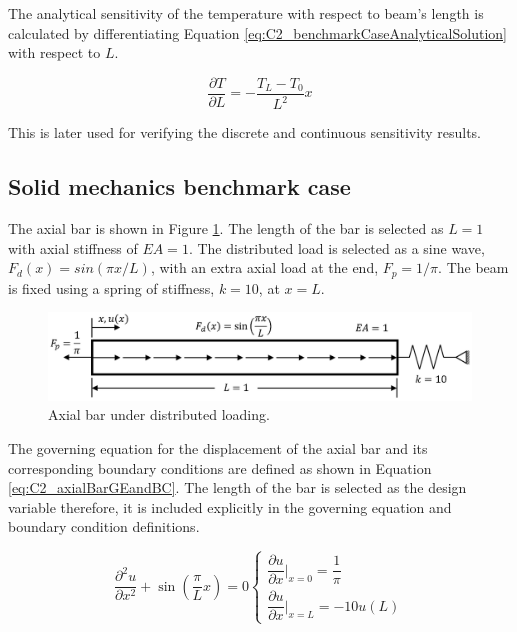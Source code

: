 The analytical sensitivity of the temperature with respect to beam's length is calculated by differentiating Equation \eqref{eq:C2_benchmarkCaseAnalyticalSolution} with respect to $L$.

\begin{equation}
	\frac{\partial T}{\partial L} = -\frac{T_L - T_0}{L^2} x
\end{equation}

This is later used for verifying the discrete and continuous sensitivity results.

\subsection{Solid mechanics benchmark case}\label{section:C2_solid_mechanics_benchmark}
The axial bar is shown in Figure \ref{fig:C2_axialBarPhysicalShape}. The length of the bar is selected as $L = 1$ with axial stiffness of $EA = 1$. The distributed load is selected as a sine wave, $F_d(x) = sin(\pi x/L)$, with an extra axial load at the end, $F_p = 1 / \pi$. The beam is fixed using a spring of stiffness, $k = 10$, at $x = L$.

\begin{figure}[h]
	\centering
	\includegraphics[width=14.00cm]{Chapter_2/figure/solid_mechanics_benchmark.png}
	\caption{Axial bar under distributed loading.}
	\label{fig:C2_axialBarPhysicalShape}
\end{figure}

The governing equation for the displacement of the axial bar and its corresponding boundary conditions are defined as shown in Equation \eqref{eq:C2_axialBarGEandBC}. The length of the bar is selected as the design variable therefore, it is included explicitly in the governing equation and boundary condition definitions.

\begin{subequations}
\begin{equation}\label{eq:C2_axialBarGE}
	\frac{\partial^2 u}{\partial x^2} + \sin \left( \frac{\pi}{L} x \right) = 0
\end{equation}
\begin{equation}\label{eq:C2_axialBarBC}
	\begin{cases}
	\dfrac{\partial u}{\partial x} \bigg|_{x = 0} = \dfrac{1}{\pi} \\
	\dfrac{\partial u}{\partial x} \bigg|_{x = L} = -10 u(L)
	\end{cases}
\end{equation}
\end{subequations}\label{eq:C2_axialBarGEandBC}

